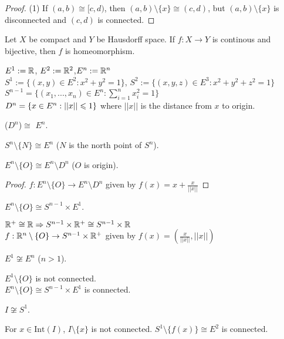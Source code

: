 \begin{proof}
    (1) If $(a,b)\cong [c,d)$, then $(a,b)\setminus \{x\} \cong (c,d)$, but $(a,b)\setminus \{x\}$ is disconnected and $(c,d)$ is connected.
\end{proof}

\begin{theorem}{}{}
    Let $X$ be compact and $Y$ be Hausdorff space. 
    If $f:X\rightarrow Y$ is continous and bijective, then
    $f$ is homeomorphism.
\end{theorem}

\begin{definition}{}{}
    $E^1:=\mathbb{R}$, $E^2:=\mathbb{R}^2$,$E^n:=\mathbb{R}^n$\\
    $S^1:=\{(x,y)\in E^2:x^2+y^2=1\}$, $S^2:=\{(x,y,z)\in E^3:x^2+y^2+z^2=1\}$\\
    $S^{n-1}=\{(x_1,...,x_n)\in E^n:\sum\limits_{i=1}^{n}x_i^2=1\}$\\
    $D^n=\{x\in E^n:||x||\leqslant 1\}$ where $||x||$ is the distance from $x$ to origin.
\end{definition}

\begin{proposition}{}{}
    ($D^n$)$\cong$ $E^n$.
\end{proposition}

\begin{proposition}{}{}
    $S^n\setminus \{N\}\cong E^n$ ($N$ is the north point of $S^n$).
\end{proposition}

\begin{proposition}{}{}
    $E^n\setminus \{O\}\cong E^n\setminus D^n$ ($O$ is origin).
\end{proposition}

\begin{proof}
    $f:E^n\setminus \{O\}\rightarrow E^n\setminus D^n$ given by $f(x)=x+\frac{x}{||x||}$
\end{proof}

\begin{proposition}{}{}
    $E^n\setminus \{O\}\cong S^{n-1}\times E^1$. 
\end{proposition}
    $\mathbb{R}^+\cong \mathbb{R}\Rightarrow S^{n-1}\times \mathbb{R}^+\cong S^{n-1}\times \mathbb{R}$\\
    $f:\mathbb{R}^n\setminus \{O\}\rightarrow S^{n-1}\times \mathbb{R}^+$ given by $f(x)=(\frac{x}{||x||},||x||)$


\begin{proposition}{}{}
    $E^1\not\cong E^n$ ($n>1$).
\end{proposition}
    $E^1\setminus \{O\}$ is not connected.\\
    $E^n\setminus \{O\}\cong S^{n-1}\times E^1$ is connected. 
\begin{proposition}{}{}
    $I\not\cong S^1$.
\end{proposition}
   For $x\in \text{Int}(I)$, $I\setminus \{x\}$ is not connected.
   $S^1\setminus \{f(x)\}\cong E^2$ is connected.

